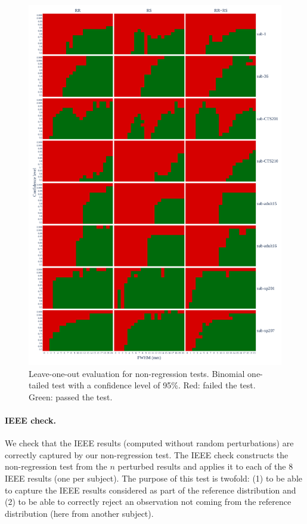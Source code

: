 \documentclass{article}
\begin{document}
\begin{figure}
    \centering
    \includegraphics[width=\linewidth]{figures/exclude_mct_fwe_bonferroni.pdf}
    \caption{Leave-one-out evaluation for non-regression tests.
        Binomial one-tailed test with a confidence level of 95\%.
        Red: failed the test. Green: passed the test.}
    \label{fig:loo_bonferroni}
\end{figure}


\paragraph{IEEE check.} We check that the IEEE results (computed without random perturbations) are correctly captured by our non-regression test. The IEEE check constructs the non-regression test from the $n$ perturbed results and applies it to each of the 8 IEEE results (one per subject). The purpose of this test is twofold: (1) to be able to capture the IEEE results considered as part of the reference distribution and (2) to be able to correctly reject an observation not coming from the reference distribution (here from another subject).
\end{document}
